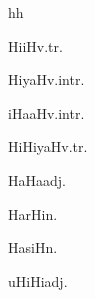\begin{multicols*}{2}
\begin{dictroot}{h}{h}
    \begin{dictentry}{HiiH}{v.tr.}
    \end{dictentry}
    \begin{dictentry}{HiyaH}{v.intr.}
    \end{dictentry}
    \begin{dictentry}{iHaaH}{v.intr.}
    \end{dictentry}
    \begin{dictentry}{HiHiyaH}{v.tr.}
    \end{dictentry}
    \begin{dictentry}{HaHa}{adj.}
    \end{dictentry}
    \begin{dictentry}{HarHi}{n.}
    \end{dictentry}
    \begin{dictentry}{HasiH}{n.}
    \end{dictentry}
    \begin{dictentry}{uHiHi}{adj.}
    \end{dictentry}
\end{dictroot}


\end{multicols*}
